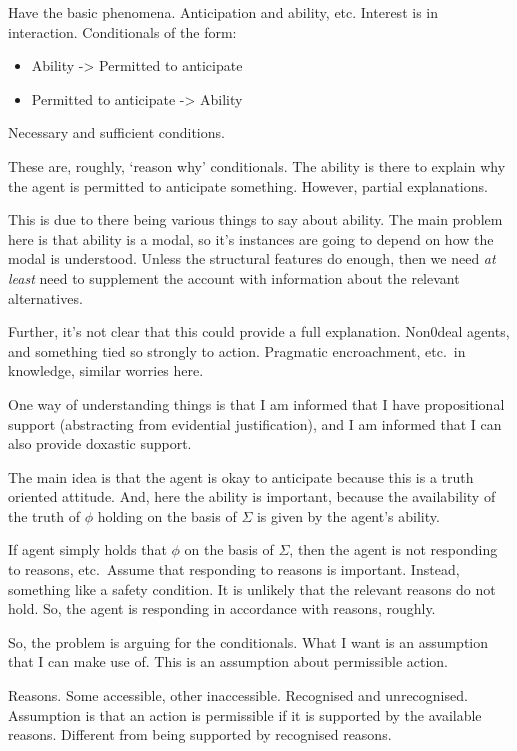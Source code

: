 \documentclass[10pt]{article}
\begin{document}
{
  \color{red}
  Have the basic phenomena.
  Anticipation and ability, etc.
  Interest is in interaction.
  Conditionals of the form:
  \begin{itemize}
  \item Ability -> Permitted to anticipate
  \item Permitted to anticipate -> Ability
  \end{itemize}
  Necessary and sufficient conditions.

  These are, roughly, `reason why' conditionals.
  The ability is there to explain why the agent is permitted to anticipate something.
  However, partial explanations.

  This is due to there being various things to say about ability.
  The main problem here is that ability is a modal, so it's instances are going to depend on how the modal is understood.
  Unless the structural features do enough, then we need \emph{at least} need to supplement the account with information about the relevant alternatives.
  
  Further, it's not clear that this could provide a full explanation.
  Non0deal agents, and something tied so strongly to action.
  Pragmatic encroachment, etc.\ in knowledge, similar worries here.


  {
    \color{blue}
    One way of understanding things is that I am informed that I have propositional support (abstracting from evidential justification), and I am informed that I can also provide doxastic support.

    The main idea is that the agent is okay to anticipate because this is a truth oriented attitude.
    And, here the ability is important, because the availability of the truth of \(\phi\) holding on the basis of \(\Sigma\) is given by the agent's ability.

    If agent simply holds that \(\phi\) on the basis of \(\Sigma\), then the agent is not responding to reasons, etc.\
    Assume that responding to reasons is important.
    Instead, something like a safety condition.
    It is unlikely that the relevant reasons do not hold.
    So, the agent is responding in accordance with reasons, roughly.
  }

  {
    \color{red}
    So, the problem is arguing for the conditionals.
    What I want is an assumption that I can make use of.
    This is an assumption about permissible action.

    Reasons.
    Some accessible, other inaccessible.
    Recognised and unrecognised.
    Assumption is that an action is permissible if it is supported by the available reasons.
    Different from being supported by recognised reasons.

}}
\end{document}
